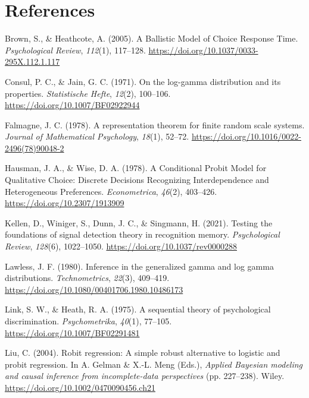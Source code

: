 \documentclass[
  man,
  floatsintext,
  longtable,
  a4paper,
  nolmodern,
  notxfonts,
  notimes,
  colorlinks=true,linkcolor=blue,citecolor=blue,urlcolor=blue]{apa7}
\newlength{\cslhangindent}
\newenvironment{CSLReferences}[2] %
 {\begin{list}{}{%
  \setlength{\itemindent}{0pt}
  \setlength{\leftmargin}{0pt}
  \setlength{\parsep}{0pt}
  \ifodd #1
   \setlength{\leftmargin}{\cslhangindent}
   \setlength{\itemindent}{-1\cslhangindent}
  \fi
  \setlength{\itemsep}{#2\baselineskip}}}
 {\end{list}}
\begin{document}
\section{References}\label{references}

\label{refs}
\begin{CSLReferences}{1}{0}
Brown, S., \& Heathcote, A. (2005). A {Ballistic Model} of {Choice
Response Time}. \emph{Psychological Review}, \emph{112}(1), 117--128.
\url{https://doi.org/10.1037/0033-295X.112.1.117}

Consul, P. C., \& Jain, G. C. (1971). On the log-gamma distribution and
its properties. \emph{Statistische Hefte}, \emph{12}(2), 100--106.
\url{https://doi.org/10.1007/BF02922944}

Falmagne, J. C. (1978). A representation theorem for finite random scale
systems. \emph{Journal of Mathematical Psychology}, \emph{18}(1),
52--72. \url{https://doi.org/10.1016/0022-2496(78)90048-2}

Hausman, J. A., \& Wise, D. A. (1978). A {Conditional Probit Model} for
{Qualitative Choice}: {Discrete Decisions Recognizing Interdependence}
and {Heterogeneous Preferences}. \emph{Econometrica}, \emph{46}(2),
403--426. \url{https://doi.org/10.2307/1913909}

Kellen, D., Winiger, S., Dunn, J. C., \& Singmann, H. (2021). Testing
the foundations of signal detection theory in recognition memory.
\emph{Psychological Review}, \emph{128}(6), 1022--1050.
\url{https://doi.org/10.1037/rev0000288}

Lawless, J. F. (1980). Inference in the generalized gamma and log gamma
distributions. \emph{Technometrics}, \emph{22}(3), 409--419.
\url{https://doi.org/10.1080/00401706.1980.10486173}

Link, S. W., \& Heath, R. A. (1975). A sequential theory of
psychological discrimination. \emph{Psychometrika}, \emph{40}(1),
77--105. \url{https://doi.org/10.1007/BF02291481}

Liu, C. (2004). Robit regression: A simple robust alternative to
logistic and probit regression. In A. Gelman \& X.-L. Meng (Eds.),
\emph{Applied {Bayesian} modeling and causal inference from
incomplete-data perspectives} (pp. 227--238). Wiley.
\url{https://doi.org/10.1002/0470090456.ch21}


\end{CSLReferences}
\end{document}
